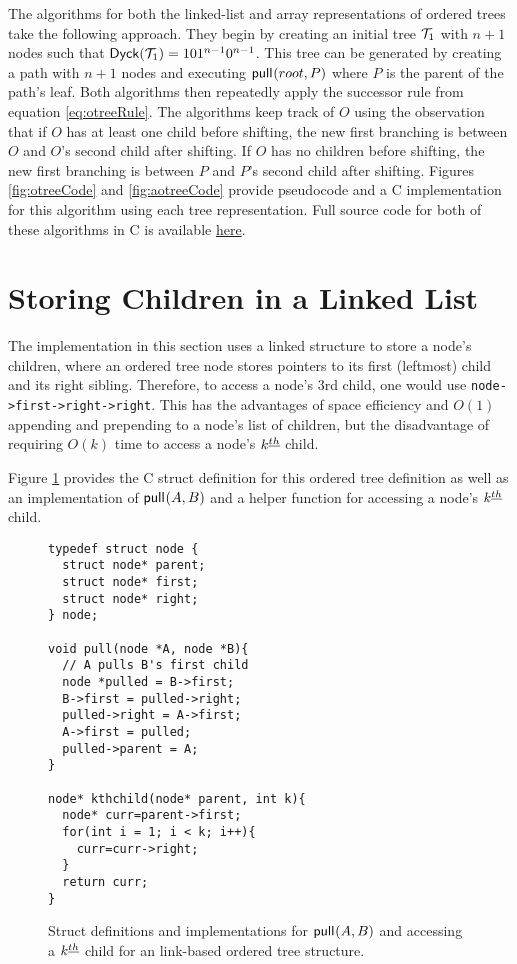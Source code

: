 The algorithms for both the linked-list and array representations of ordered trees take the following approach.  They begin by creating an initial tree $\mathcal{T}_1$ with $n+1$ nodes such that $\mathsf{Dyck}{(\mathcal{T}_1)}=101^{n-1}0^{n-1}$.  This tree can be generated by creating a path with $n+1$ nodes and executing $\mathsf{pull}_{}(root,P)$ where $P$ is the parent of the path's leaf. Both algorithms then repeatedly apply the successor rule from equation \ref{eq:otreeRule}.  The algorithms keep track of $O$ using the observation that if $O$ has at least one child before shifting, the new first branching is between $O$ and $O$'s second child after shifting.  If $O$ has no children before shifting, the new first branching is between $P$ and $P$'s second child after shifting. Figures \ref{fig:otreeCode} and \ref{fig:aotreeCode} provide pseudocode and a C implementation for this algorithm using each tree representation.  Full source code for both of these algorithms in C is available \href{https://github.com/pwl45/ordered-trees/tree/main/otree}{here}.

\section{Storing Children in a Linked List}\label{sec:otree-link}
The implementation in this section uses a linked structure to store a node's children, where an ordered tree node stores pointers to its first (leftmost) child and its right sibling.  Therefore, to access a node's 3rd child, one would use \verb+node->first->right->right+.
This has the advantages of space efficiency and $O(1)$ appending and prepending to a node's list of children, but the disadvantage of requiring $O(k)$ time to access a node's $k^{\underline{th}}$ child. 

Figure \ref{fig:otreestarter-link} provides the C struct definition for this ordered tree definition as well as an implementation of $\mathsf{pull}_{}(A,B)$ and a helper function for accessing a node's $k^{\underline{th}}$ child. 

\begin{figure}
	\begin{center}

	    \begin{Verbatim}
typedef struct node {
  struct node* parent;
  struct node* first;
  struct node* right;
} node;

void pull(node *A, node *B){ 
  // A pulls B's first child
  node *pulled = B->first;
  B->first = pulled->right;
  pulled->right = A->first;
  A->first = pulled;
  pulled->parent = A;
}

node* kthchild(node* parent, int k){
  node* curr=parent->first;
  for(int i = 1; i < k; i++){
    curr=curr->right;
  }
  return curr;
}
\end{Verbatim}

    \cprotect\caption{Struct definitions and implementations for $\mathsf{pull}_{}(A,B)$ and accessing a $k^{\underline{th}}$ child for an link-based ordered tree structure.}
\label{fig:otreestarter-link}
	\end{center}
\end{figure}

